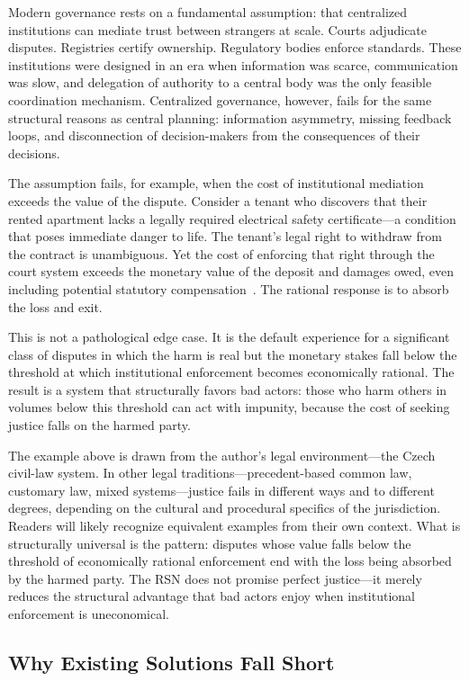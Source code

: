\documentclass[11pt,a4paper,twocolumn]{article}
\begin{document}
Modern governance rests on a fundamental assumption: that centralized institutions can mediate trust between strangers at scale. Courts adjudicate disputes. Registries certify ownership. Regulatory bodies enforce standards. These institutions were designed in an era when information was scarce, communication was slow, and delegation of authority to a central body was the only feasible coordination mechanism. Centralized governance, however, fails for the same structural reasons as central planning: information asymmetry, missing feedback loops, and disconnection of decision-makers from the consequences of their decisions.

The assumption fails, for example, when the cost of institutional mediation exceeds the value of the dispute. Consider a tenant who discovers that their rented apartment lacks a legally required electrical safety certificate---a condition that poses immediate danger to life. The tenant's legal right to withdraw from the contract is unambiguous. Yet the cost of enforcing that right through the court system exceeds the monetary value of the deposit and damages owed, even including potential statutory compensation~\cite{czcourtfees}. The rational response is to absorb the loss and exit.

This is not a pathological edge case. It is the default experience for a significant class of disputes in which the harm is real but the monetary stakes fall below the threshold at which institutional enforcement becomes economically rational. The result is a system that structurally favors bad actors: those who harm others in volumes below this threshold can act with impunity, because the cost of seeking justice falls on the harmed party.

The example above is drawn from the author's legal environment---the Czech civil-law system. In other legal traditions---precedent-based common law, customary law, mixed systems---justice fails in different ways and to different degrees, depending on the cultural and procedural specifics of the jurisdiction. Readers will likely recognize equivalent examples from their own context. What is structurally universal is the pattern: disputes whose value falls below the threshold of economically rational enforcement end with the loss being absorbed by the harmed party. The RSN does not promise perfect justice---it merely reduces the structural advantage that bad actors enjoy when institutional enforcement is uneconomical.

\subsection{Why Existing Solutions Fall Short}
\end{document}
